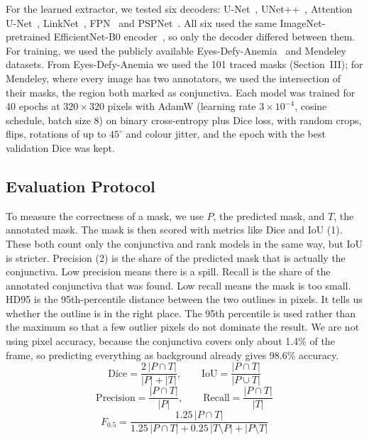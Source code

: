\documentclass[conference]{IEEEtran}
\begin{document}
For the learned extractor, we tested six decoders:
U-Net~\cite{ronneberger2015}, UNet++~\cite{zhou2018unetpp}, Attention
U-Net~\cite{oktay2018}, LinkNet~\cite{chaurasia2017}, FPN~\cite{lin2017fpn} and
PSPNet~\cite{zhao2017pspnet}. All six used the same ImageNet-pretrained
EfficientNet-B0 encoder~\cite{tan2019efficientnet}, so only the decoder differed
between them. For training, we used the publicly available
Eyes-Defy-Anemia~\cite{dimauro2023} and Mendeley~\cite{rahman_mendeley}
datasets. From Eyes-Defy-Anemia we used the 101 traced masks (Section~III); for
Mendeley, where every image has two annotators, we used the intersection of
their masks, the region both marked as conjunctiva. Each model was trained for
40 epochs at $320 \times 320$ pixels with AdamW (learning rate $3 \times
10^{-4}$, cosine schedule, batch size 8) on binary cross-entropy plus Dice loss,
with random crops, flips, rotations of up to $45^\circ$ and colour jitter, and
the epoch with the best validation Dice was kept.

\subsection{Evaluation Protocol}
To measure the correctness of a mask, we use $P$, the predicted mask, and $T$,
the annotated mask. The mask is then scored with metrics like Dice and IoU (1).
These both count only the conjunctiva and rank models in the same way, but IoU
is stricter. Precision (2) is the share of the predicted mask that is actually
the conjunctiva. Low precision means there is a spill. Recall is the share of
the annotated conjunctiva that was found. Low recall means the mask is too
small. HD95 is the 95th-percentile distance between the two outlines in pixels.
It tells us whether the outline is in the right place. The 95th percentile is
used rather than the maximum so that a few outlier pixels do not dominate the
result. We are not using pixel accuracy, because the conjunctiva covers only
about 1.4\% of the frame, so predicting everything as background already gives
98.6\% accuracy.
\begin{equation}
\mathrm{Dice} = \frac{2\,|P \cap T|}{|P| + |T|}, \qquad
\mathrm{IoU} = \frac{|P \cap T|}{|P \cup T|}
\end{equation}
\begin{equation}
\mathrm{Precision} = \frac{|P \cap T|}{|P|}, \qquad
\mathrm{Recall} = \frac{|P \cap T|}{|T|}
\end{equation}
\begin{equation}
F_{0.5} = \frac{1.25\,|P \cap T|}{1.25\,|P \cap T| + 0.25\,|T \setminus P| + |P \setminus T|}
\end{equation}
\end{document}
